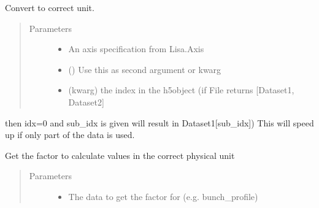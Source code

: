\documentclass[letterpaper,10pt,openany,oneside,english]{sphinxmanual}
\begin{document}
\begin{fulllineitems}
\begin{fulllineitems}
\begin{quote}
\begin{description}
\end{description}\end{quote}

\end{fulllineitems}


\begin{fulllineitems}
\label{\detokenize{data:data.Data.__getattr__}}
Convert to correct unit.
\begin{quote}\begin{description}
\item[{Parameters}] \leavevmode\begin{itemize}
\item {} 
 \textendash{} An axis specification from Lisa.Axis

\item {} 
 () \textendash{} Use this as second argument or kwarg

\item {} 
 \textendash{} (kwarg) the index in the h5object (if File returns {[}Dataset1, Dataset2{]}

\end{itemize}

\end{description}\end{quote}

then idx=0 and sub\_idx is given will result in Dataset1{[}sub\_idx{]})  
This will speed up if only part of the data is used.

\end{fulllineitems}


\begin{fulllineitems}
\label{\detokenize{data:data.Data.unit_factor}}
Get the factor to calculate values in the correct physical unit
\begin{quote}\begin{description}
\item[{Parameters}] \leavevmode\begin{itemize}
\item {} 
 \textendash{} The data to get the factor for (e.g. bunch\_profile)


\end{itemize}
\end{description}
\end{quote}
\end{fulllineitems}
\end{fulllineitems}
\end{document}

